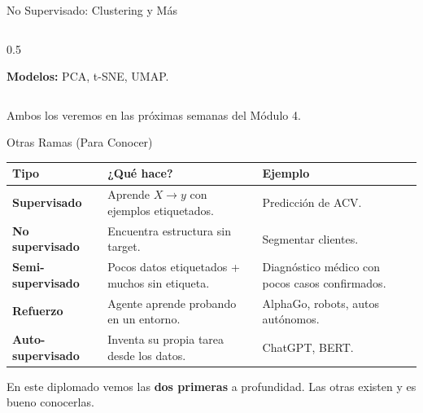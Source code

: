 \documentclass[aspectratio=169, 11pt]{beamer}
\begin{document}
\begin{frame}{No Supervisado: Clustering y Más}
\begin{columns}[T]
\begin{column}{0.5\textwidth}
\begin{tcolorbox}[colback=codeOrange!8, colframe=codeOrange, boxrule=0.5pt,
        arc=2pt, title={\small\color{white}\bfseries\faCompressArrowsAlt\ Reducción de Dim.}]
{        \vspace{3pt}
        \textbf{Modelos:} PCA, t-SNE, UMAP.}
      \end{tcolorbox}
    \end{column}
  \end{columns}

  \vspace{4pt}
  {\scriptsize\color{textMuted}
    \faArrowRight\hspace{4pt} Ambos los veremos en las próximas semanas del Módulo 4.}
\end{frame}

\begin{frame}[shrink=10]{Otras Ramas (Para Conocer)}
  \vspace{-4pt}
  {\footnotesize
  \begin{tabular}{@{}p{3.2cm}p{4.5cm}p{4.8cm}@{}}
    \toprule
    \textbf{Tipo} & \textbf{¿Qué hace?} & \textbf{Ejemplo} \\
    \midrule
    \textbf{\color{codeBlue}Supervisado} & Aprende $X \to y$ con ejemplos etiquetados. & Predicción de ACV. \\
    \textbf{\color{codePurple}No supervisado} & Encuentra estructura sin target. & Segmentar clientes. \\
    \textbf{\color{codeOrange}Semi-supervisado} & Pocos datos etiquetados + muchos sin etiqueta. & Diagnóstico médico con pocos casos confirmados. \\
    \textbf{\color{codeGreen}Refuerzo} & Agente aprende probando en un entorno. & AlphaGo, robots, autos autónomos. \\
    \textbf{\color{arcaRed}Auto-supervisado} & Inventa su propia tarea desde los datos. & ChatGPT, BERT. \\
    \bottomrule
  \end{tabular}
  }

  \vspace{6pt}
  {\scriptsize\color{textMuted}
    \faLightbulb\hspace{4pt} En este diplomado vemos las \textbf{dos primeras}
    a profundidad. Las otras existen y es bueno conocerlas.}
\end{frame}
\end{document}
